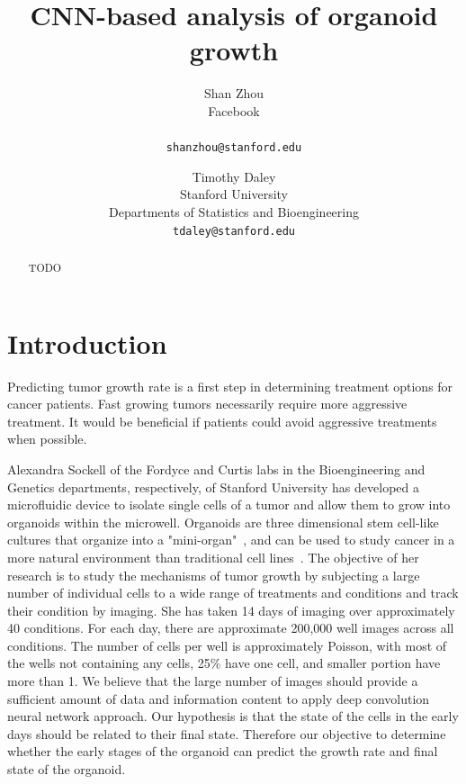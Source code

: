 \documentclass[10pt,twocolumn,letterpaper]{article}
\begin{document}
\title{CNN-based analysis of organoid growth}

\author{Shan Zhou \\
Facebook \\
\\
{\tt\small shanzhou@stanford.edu}
\and
Timothy Daley \\
Stanford University \\
Departments of Statistics and Bioengineering \\
{\tt\small tdaley@stanford.edu}
}

\maketitle

\begin{abstract}
TODO   
\end{abstract}

\section{Introduction}

Predicting tumor growth rate is a first step in determining treatment options for cancer patients.  Fast growing tumors necessarily require more aggressive treatment.  It would be beneficial if patients could avoid aggressive treatments when possible.  

Alexandra Sockell of the Fordyce and Curtis labs in the Bioengineering and Genetics departments, respectively, of Stanford University has developed a microfluidic device to isolate single cells of a tumor and allow them to grow into organoids  within the microwell.  Organoids are three dimensional stem cell-like cultures that organize into a "mini-organ"~\cite{rios2018imaging}, and can be used to study cancer in a more natural environment than traditional cell lines~\cite{drost2018organoids}.
The objective of her research is to study the mechanisms of tumor growth by subjecting a large number of  individual cells to a wide range of treatments and conditions and track their condition by imaging.  She has taken 14 days of imaging over approximately 40 conditions.    For each day, there are approximate 200,000 well images across all conditions.  The number of cells per well is approximately Poisson, with most of the wells not containing any cells, 25\% have one cell, and smaller portion have more than 1.  We believe that the large number of images should provide a sufficient amount of data and information content to apply deep convolution neural network approach.  Our hypothesis is that the state of the cells in the early days should be related to their final state.  Therefore our objective to determine whether the early stages of the organoid can predict the growth rate and final state of the organoid.    
\end{document}
